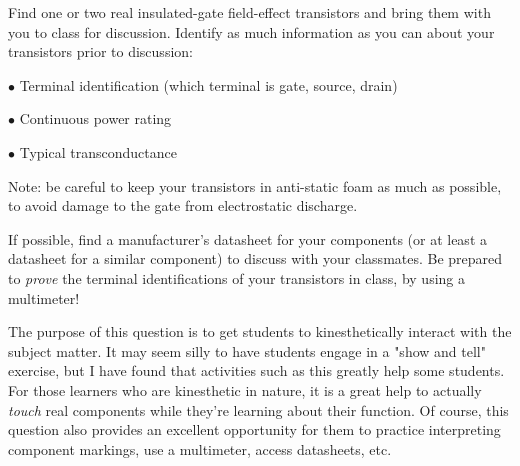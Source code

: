 

Find one or two real insulated-gate field-effect transistors and bring them with you to class for discussion.  Identify as much information as you can about your transistors prior to discussion:

\medskip
\item{$\bullet$} Terminal identification (which terminal is gate, source, drain)
\item{$\bullet$} Continuous power rating
\item{$\bullet$} Typical transconductance 
\medskip

Note: be careful to keep your transistors in anti-static foam as much as possible, to avoid damage to the gate from electrostatic discharge.







If possible, find a manufacturer's datasheet for your components (or at least a datasheet for a similar component) to discuss with your classmates.  Be prepared to {\it prove} the terminal identifications of your transistors in class, by using a multimeter!







The purpose of this question is to get students to kinesthetically interact with the subject matter.  It may seem silly to have students engage in a "show and tell" exercise, but I have found that activities such as this greatly help some students.  For those learners who are kinesthetic in nature, it is a great help to actually {\it touch} real components while they're learning about their function.  Of course, this question also provides an excellent opportunity for them to practice interpreting component markings, use a multimeter, access datasheets, etc.




